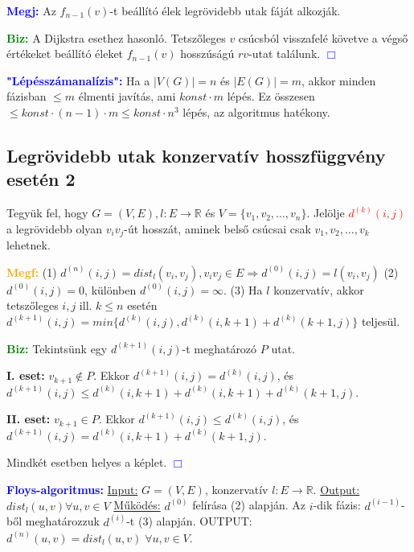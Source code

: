 \documentclass[../szamtud.tex]{subfiles}
\begin{document}
        \textcolor{blue}{\textbf{Megj:}} Az $f_{n-1}(v)$-t beállító élek legrövidebb utak fáját alkozják. 

        \textcolor{green}{\textbf{Biz:}} A Dijkstra esethez hasonló. Tetszőleges $v$ csúcsból visszafelé követve a végső értékeket beállító éleket $f_{n-1}(v)$ hosszúságú $rv$-utat találunk.  \textcolor{blue}{$\Box$} 

        \textcolor{blue}{\textbf{"Lépésszámanalízis":}} Ha a $|V(G)| = n$ és $|E(G)| = m$, akkor minden fázisban $\leq m$ élmenti javítás, ami $konst \cdot m$ lépés. Ez összesen $\leq konst \cdot (n-1) \cdot m \leq konst \cdot n^3$ lépés, az algoritmus hatékony.

    \subsection{Legrövidebb utak konzervatív hosszfüggvény esetén 2}

        Tegyük fel, hogy $G = (V,E), l:E \rightarrow \mathbb{R}$ és $V = \{v_1, v_2, \dots,v_n\}$. Jelölje \textcolor{red}{$d^{(k)}(i,j)$} a legrövidebb olyan $v_iv_j$-út hosszát, aminek belső csúcsai csak $v_1,v_2,\dots,v_k$ lehetnek.

        \textcolor{orange}{\textbf{Megf:}} (1) $d^{(n)}(i,j) = dist_l(v_i,v_j), v_iv_j \in E \Rightarrow d^{(0)}(i,j) = l(v_i,v_j)$ (2) $d^{(0)}(i,j) = 0$, különben $d^{(0)}(i,j) = \infty$. (3) Ha $l$ konzervatív, akkor tetszőleges $i,j$ ill. $k \leq n$ esetén $d^{(k+1)}(i,j) = min \{d^{(k)}(i,j), d^{(k)}(i,k+1)+d^{(k)}(k+1,j)\}$ teljesül.

        \textcolor{green}{\textbf{Biz:}} Tekintsünk egy $d^{(k+1)}(i,j)$-t meghatározó $P$ utat. 
        
        \textbf{I. eset:} $v_{k+1} \notin P$. Ekkor $d^{(k+1)}(i,j) = d^{(k)}(i,j)$, és $d^{(k+1)}(i,j) \leq d^{(k)}(i,k+1)+d^{(k)}(i,k+1)+d^{(k)}(k+1,j)$.

        \textbf{II. eset:} $v_{k+1} \in P$. Ekkor $d^{(k+1)}(i,j) \leq d^{(k)}(i,j)$, és $d^{(k+1)}(i,j) = d^{(k)}(i,k+1) + d^{(k)}(k+1,j)$.

        Mindkét esetben helyes a képlet.  \textcolor{blue}{$\Box$} 

        \textcolor{blue}{\textbf{Floys-algoritmus:}} \underline{Input:} $G = (V,E)$, konzervatív $l:E \rightarrow \mathbb{R}$. \underline{Output:} $dist_l(u,v)\forall u,v \in V$ \underline{Működés:} $d^{(0)}$ felírása (2) alapján. Az $i$-dik fázis: $d^{(i-1)}$-ből meghatározzuk $d^{(i)}$-t (3) alapján. OUTPUT: $d^{(n)}(u,v) = dist_l(u,v)\; \forall u,v \in V$.
\end{document}
